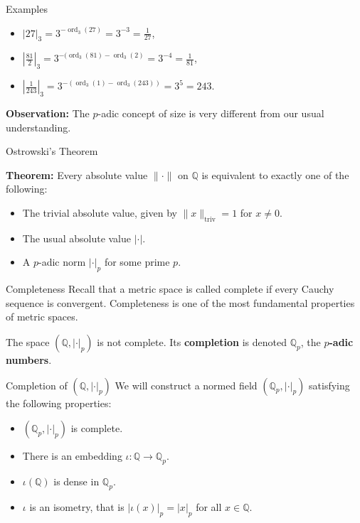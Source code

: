 \documentclass{beamer}
\newcommand{\Q}{\mathbb{Q}}
\begin{document}
\begin{frame}{Examples}
\begin{itemize}

\item $|27|_3 = 3^{-\operatorname{ord}_3(27)} = 3^{-3} = \frac{1}{27}$,
\item $\left|\frac{81}{2}\right|_3 = 3^{-(\operatorname{ord}_3(81) - \operatorname{ord}_3(2)} = 3^{-4} = \frac{1}{81}$,
\item $\left|\frac{1}{243}\right|_3 = 3^{-(\operatorname{ord}_3(1) - \operatorname{ord}_3(243))} = 3^{5} = 243$.
\end{itemize}
\bigskip
\pause
\textbf{Observation:} The $p$-adic concept of size is very different from our usual understanding.
\end{frame}

\begin{frame}{Ostrowski's Theorem}

\textbf{Theorem:} Every absolute value $\|\cdot\|$ on $\mathbb{Q}$ is equivalent to exactly one of the following:
\begin{itemize}
    \item The trivial absolute value, given by $\|x\|_{\mathrm{triv}} = 1$ for $x \neq 0$.
    \item The usual absolute value $|\cdot|$.
    \item A $p$-adic norm $|\cdot|_p$ for some prime $p$.
\end{itemize}
\end{frame}

\begin{frame}{Completeness}
    Recall that a metric space is called complete if every Cauchy sequence is convergent.
    Completeness is one of the most fundamental properties of metric spaces.
    \pause
    
    \bigskip
    The space $(\Q, |\cdot|_p)$ is not complete. Its \textbf{completion} is denoted 
    $\Q_p$, the \textbf{$p$-adic numbers}.
\end{frame}

\begin{frame}{Completion of $(\Q, |\cdot|_p)$}
    We will construct a normed field $(\Q_p, |\cdot|_p)$ satisfying the following properties:
    \pause
    \begin{itemize}
        \item $(\Q_p, |\cdot|_p)$ is complete.
        \pause 
        \item There is an embedding $\iota \colon \Q \to \Q_p$.
        \pause 
        \item $\iota(\Q)$ is dense in $\Q_p$.
        \pause 
        \item $\iota$ is an isometry, that is $|\iota(x)|_p = |x|_p$ for all $x \in \Q$.
    \end{itemize}
\end{frame}
\end{document}
